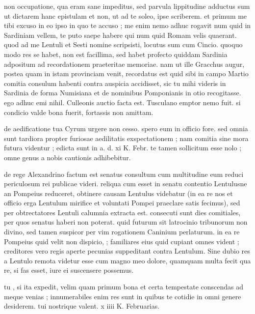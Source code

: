 


 non occupatione, qua eram sane impeditus, sed parvula lippitudine adductus sum ut dictarem hanc epistulam et non, ut ad te soleo, ipse scriberem. et primum me tibi excuso in eo ipso in quo te accuso ; me enim nemo adhuc rogavit num quid in Sardiniam vellem, te puto saepe habere qui num quid Romam velis quaerant. quod ad me Lentuli et Sesti nomine scripsisti, locutus sum cum Cincio. quoquo modo res se habet, non est facillima, sed habet profecto quiddam Sardinia adpositum ad recordationem praeteritae memoriae. nam ut ille Gracchus augur, postea quam in istam provinciam venit, recordatus est quid sibi in campo Martio comitia consulum habenti contra auspicia accidisset, sic tu mihi videris in Sardinia de forma Numisiana et de nominibus Pomponianis in otio recogitasse. ego adhuc emi nihil. Culleonis auctio facta est. Tusculano emptor nemo fuit. si condicio valde bona fuerit, fortassis non amittam.

 de aedificatione tua Cyrum urgere non cesso. spero eum in officio fore. sed omnia sunt tardiora propter furiosae aedilitatis exspectationem ; nam comitia sine mora futura videntur ; edicta sunt in a. d. xi K. Febr. te tamen sollicitum esse nolo ; omne genus a nobis cautionis adhibebitur.

 de rege Alexandrino factum est senatus consultum cum multitudine eum reduci periculosum rei publicae videri. reliqua cum esset in senatu contentio Lentulusne an Pompeius reduceret, obtinere causam Lentulus videbatur (in ea re nos et officio erga Lentulum mirifice et voluntati Pompei praeclare satis fecimus), sed per obtrectatores Lentuli calumnia extracta est. consecuti sunt dies comitiales, per quos senatus haberi non poterat. quid futurum sit latrocinio tribunorum non divino, sed tamen suspicor per vim rogationem Caninium perlaturum. in ea re Pompeius quid velit non dispicio, ; familiares eius quid cupiant omnes vident ; creditores vero regis aperte pecunias suppeditant contra Lentulum. Sine dubio res a Lentulo remota videtur esse cum magno meo dolore, quamquam multa fecit qua re, si fas esset, iure ei suscensere possemus.

 tu , si ita expedit, velim quam primum bona et certa tempestate conscendas ad meque venias ; innumerabiles enim res sunt in quibus te cotidie in omni genere desiderem. tui nostrique valent. x iiii K. Februarias.
